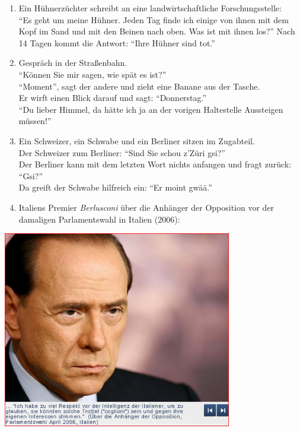 \documentclass[
  letterpaper,
]{scrbook}
\begin{document}
\begin{enumerate}
\def\labelenumi{(\arabic{enumi})}
\setcounter{enumi}{12}
\item
  Ein Hühnerzüchter schreibt an eine landwirtschaftliche
  Forschungsstelle:\\
  ``Es geht um meine Hühner. Jeden Tag finde ich einige von ihnen mit
  dem Kopf im Sand und mit den Beinen nach oben. Was ist mit ihnen
  los?'' Nach 14 Tagen kommt die Antwort: ``Ihre Hühner sind tot.''
\item
  Gespräch in der Straßenbahn.\\
  ``Können Sie mir sagen, wie spät es ist?''\\
  ``Moment'', sagt der andere und zieht eine Banane aus der Tasche.\\
  Er wirft einen Blick darauf und sagt: ``Donnerstag.''\\
  ``Du lieber Himmel, da hätte ich ja an der vorigen Haltestelle
  Aussteigen müssen!''
\item
  Ein Schweizer, ein Schwabe und ein Berliner sitzen im Zugabteil.\\
  Der Schweizer zum Berliner: ``Sind Sie schou z'Züri gsi?''\\
  Der Berliner kann mit dem letzten Wort nichts anfangen und fragt
  zurück: ``Gsi?''\\
  Da greift der Schwabe hilfreich ein: ``Er moint gwää.''
\item
  Italiens Premier \emph{Berlusconi} über die Anhänger der Opposition
  vor der damaligen Parlamentswahl in Italien (2006):
\end{enumerate}

\includegraphics[width=0.75\textwidth,height=\textheight]{./pictures/textkriterien_9.png}
\end{document}
